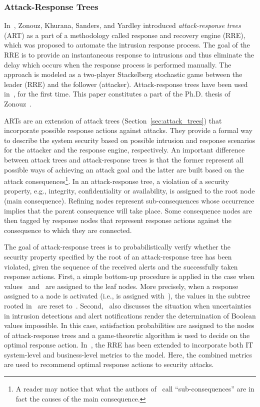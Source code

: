 \documentclass[a4paper]{article}
\begin{document}
\subsubsection{Attack-Response Trees} 
\label{sec:attack_response_trees}

In~, Zonouz, Khurana, Sanders, and Yardley introduced
\emph{attack-response trees} (ART) as a part of a methodology called response
and recovery engine (RRE), which was proposed to automate the intrusion response
process. The goal of the RRE is to provide an instantaneous response to
intrusions and thus eliminate the delay which occurs when the response process
is performed manually. The approach is modeled as a two-player Stackelberg
stochastic game between the leader (RRE) and the follower (attacker).
Attack-response trees have been used in~\cite{ZoKhSaYa}, for the first time.
This paper constitutes a part of the Ph.D. thesis of Zonouz~\cite{Zonouz}.

ARTs are an extension of attack trees (Section~\ref{sec:attack_trees}) that
incorporate possible response actions against attacks. They provide a formal way
to describe the system security based on possible intrusion and response
scenarios for the attacker and the response engine, respectively. An important
difference between attack trees and attack-response trees is that the former
represent all possible ways of achieving an attack goal and the latter are built
based on the attack consequences\footnote{A reader may notice that  what the
authors of~\cite{ZoKhSaYa} call ``sub-consequences'' are in fact the  causes of
the main consequence.}. In an attack-response tree, a violation of a security
property, e.g., integrity, confidentiality or availability, is assigned to the
root node (main consequence). Refining nodes represent sub-consequences whose
occurrence implies that the parent consequence will take place. Some consequence
nodes are then tagged by response nodes that represent response actions against
the consequence to which they are connected.

The goal of attack-response trees is to probabilistically verify whether the
security property specified by the root of an attack-response tree has been
violated, given the sequence of the received alerts and the successfully taken
response actions. First, a simple bottom-up procedure is applied in the case
when values~ and~ are assigned to the leaf nodes. More precisely, when a
response assigned to a node  is activated (i.e., is assigned with~), the
values in the subtree rooted in~ are reset to~. Second,~\cite{ZoKhSaYa}
also discusses the situation when uncertainties in intrusion detections and
alert notifications render the determination of Boolean values impossible. In
this case, satisfaction probabilities are assigned to the nodes of
attack-response trees and a game-theoretic algorithm is used to decide on the
optimal response action. In~\cite{ZoShRaKaPfAuIySaCo}, the RRE has been extended
to incorporate both IT system-level and business-level metrics to the model.
Here, the combined metrics are used to recommend optimal response actions to
security attacks.
\end{document}
